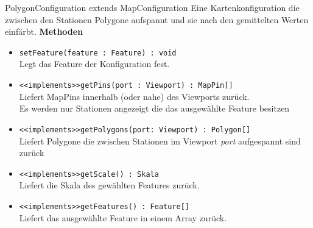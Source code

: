    \begin{Class}{PolygonConfiguration extends MapConfiguration}
        Eine Kartenkonfiguration die zwischen den Stationen Polygone aufspannt und sie nach den gemittelten Werten einfärbt.
        \textbf{Methoden}
        \begin{itemize}
            \item \texttt{setFeature(feature : Feature) : void}
            \\ Legt das Feature der Konfiguration fest.
            \item \texttt{<<implements>>getPins(port : Viewport) : MapPin[]}
            \\ Liefert MapPins innerhalb (oder nahe) des Viewports zurück.
            \\ Es werden nur Stationen angezeigt die das ausgewählte Feature besitzen
            \item \texttt{<<implements>>getPolygons(port: Viewport) : Polygon[]}
            \\ Liefert Polygone die zwischen Stationen im Viewport \emph{port} aufgespannt sind zurück
            \item \texttt{<<implements>>getScale() : Skala}
            \\ Liefert die Skala des gewählten Features zurück.
            \item \texttt{<<implements>>getFeatures() : Feature[]}
            \\ Liefert das ausgewählte Feature in einem Array zurück.
        \end{itemize}
    \end{Class}

